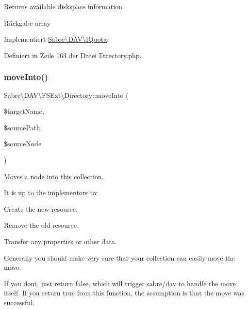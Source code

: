 Returns available diskspace information

\begin{DoxyReturn}{Rückgabe}
array 
\end{DoxyReturn}


Implementiert \mbox{\hyperlink{interface_sabre_1_1_d_a_v_1_1_i_quota_a38730776dffcebd1c486acaf1bf470e4}{Sabre\textbackslash{}\+D\+A\+V\textbackslash{}\+I\+Quota}}.



Definiert in Zeile 163 der Datei Directory.\+php.

\mbox{\label{class_sabre_1_1_d_a_v_1_1_f_s_ext_1_1_directory_a0b0f044e2346a01a1b01f90d1bb20ae7}} 
\subsubsection{\texorpdfstring{move\+Into()}{moveInto()}}
{\footnotesize\ttfamily Sabre\textbackslash{}\+D\+A\+V\textbackslash{}\+F\+S\+Ext\textbackslash{}\+Directory\+::move\+Into (\begin{DoxyParamCaption}\item[{}]{\$target\+Name,  }\item[{}]{\$source\+Path,  }\item[{\mbox{\hyperlink{interface_sabre_1_1_d_a_v_1_1_i_node}{D\+A\+V\textbackslash{}\+I\+Node}}}]{\$source\+Node }\end{DoxyParamCaption})}

Moves a node into this collection.

It is up to the implementors to\+:
\begin{DoxyEnumerate}
\item Create the new resource.
\item Remove the old resource.
\item Transfer any properties or other data.
\end{DoxyEnumerate}

Generally you should make very sure that your collection can easily move the move.

If you don\textquotesingle{}t, just return false, which will trigger sabre/dav to handle the move itself. If you return true from this function, the assumption is that the move was successful.


